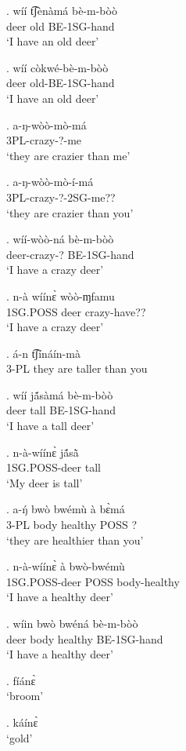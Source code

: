 \documentclass{assets/fieldnotes}
\begin{document}
\exg. wíí t͡ʃènàmá bè-m-bòò\\
deer old BE-1SG-hand\\
`I have an old deer'

\exg. wíí còkwé-bè-m-bòò\\
deer old-BE-1SG-hand\\
`I have an old deer'


\exg. a-ŋ-wòò-mò-má\\
3PL-crazy-?-me\\
`they are crazier than me'

\exg. a-ŋ-wòò-mò-í-má\\
3PL-crazy-?-2SG-me??\\
`they are crazier than you'


\exg. wíí-wòò-ná bè-m-bòò\\
deer-crazy-? BE-1SG-hand\\
`I have a crazy deer'

\exg. n-à wíínɛ̀ wòò-ɱfamu\\
1SG.POSS deer crazy-have??\\
`I have a crazy deer'

\exg. á-n t͡ʃínáín-mà\\
3-PL
they are taller than you 

\exg. wíí jã́sàmá bè-m-bòò\\
deer tall BE-1SG-hand\\
`I have a tall deer'

\exg. n-à-wíínɛ̀ jã́sã̀\\
1SG.POSS-deer tall\\
`My deer is tall'

\exg. a-ŋ́ bwò bwémù à bɛ̀má\\
3-PL body healthy POSS ?\\
`they are healthier than you'

\exg. n-à-wíínɛ̀ à bwò-bwémù\\
1SG.POSS-deer POSS body-healthy\\
`I have a healthy deer'

\exg. wíin bwò bwéná bè-m-bòò\\
deer body healthy BE-1SG-hand\\
`I have a healthy deer'


\ex. fíánɛ̀\\
`broom'

\ex. káínɛ̀\\
`gold'
\end{document}
